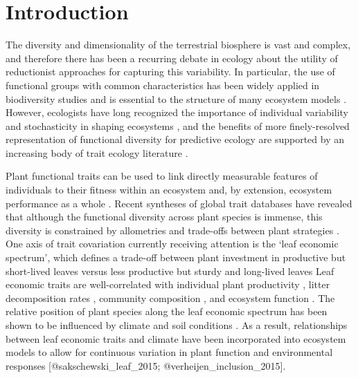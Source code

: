 \section{Introduction}

The diversity and dimensionality of the terrestrial biosphere is vast and complex, and therefore there has been a recurring debate in ecology about the utility of reductionist approaches for capturing this variability.
In particular, the use of functional groups with common characteristics has been widely applied in biodiversity studies \cite{naeem_disentangling_2003} and is essential to the structure of many ecosystem models \cite{lavorel_plant_1997,wullschleger_plant_2014}.
However, ecologists have long recognized the importance of individual variability and stochasticity in shaping ecosystems
\cite{gleason_individualistic_1926,bolnick_why_2011,rosindell_unified_2011,clark_why_2016},
and the benefits of more finely-resolved representation of functional diversity for predictive ecology are supported by an increasing body of trait ecology literature
\cite{mayfield_diversity_2006,mcmahon_improving_2011,van_bodegom_going_2012, reichstein_linking_2014,violle_emergence_2014,medlyn_using_2015,moran_intraspecific_2016}.

Plant functional traits can be used to link directly measurable features of individuals to their fitness within an ecosystem and, by extension, ecosystem performance as a whole \cite{violle_let_2007}.
Recent syntheses of global trait databases have revealed that although the functional diversity across plant species is immense, this diversity is constrained by allometries and trade-offs between plant strategies \cite{wright_worldwide_2004,kattge_try_2011,kleyer_why_2015,diaz_global_2016}.
One axis of trait covariation currently receiving attention is the ‘leaf economic spectrum’, which defines a trade-off between plant investment in productive but short-lived leaves versus less productive but sturdy and long-lived leaves \cite{wright_worldwide_2004,shipley_fundamental_2006,reich_world-wide_2014,diaz_global_2016}
Leaf economic traits are well-correlated with
individual plant productivity \cite{shipley_functional_2005,niinemets_within-canopy_2016,wu_convergence_2016},
litter decomposition rates \cite{bakker_leaf_2011,hobbie_plant_2015},
community composition \cite{burns_patterns_2004,cavender-bares_multiple_2004},
and ecosystem function \cite{diaz_plant_2004,musavi_imprint_2015}.
The relative position of plant species along the leaf economic spectrum has been shown to be influenced by climate and soil conditions
\cite{wright_worldwide_2004,wright_modulation_2005,cornwell_community_2009,ordonez_global_2009,wigley_leaf_2016}.
As a result, relationships between leaf economic traits and climate have been incorporated into ecosystem models to allow for continuous variation in plant function and environmental responses
[@sakschewski_leaf_2015; @verheijen_inclusion_2015].

